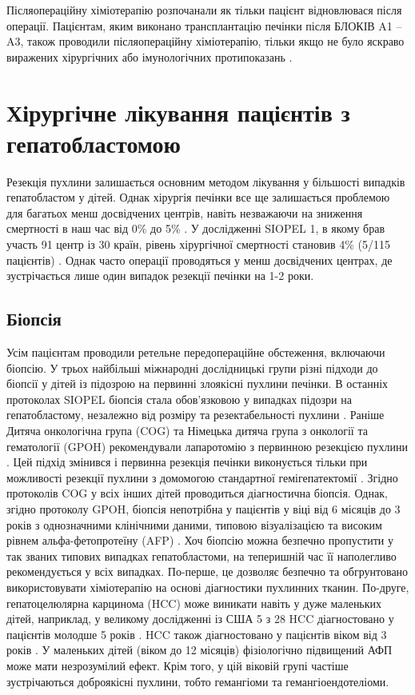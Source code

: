 Післяопераційну хіміотерапію розпочанали як тільки пацієнт відновлювася після операції. Пацієнтам, яким виконано трансплантацію печінки після БЛОКІВ A1 – A3, також проводили післяопераційну хіміотерапію, тільки якщо не було яскраво виражених хірургічних або імунологічних протипоказань \cite{pmid27910913}.


\section{Хірургічне лікування пацієнтів з гепатобластомою}
Резекція пухлини залишається основним методом лікування у більшості випадків гепатобластом у дітей. Однак хірургія печінки все ще залишається проблемою для багатьох менш досвідчених центрів, навіть незважаючи на зниження смертності в наш час від 0\% до 5\% \cite{pmid25649007}. У дослідженні SIOPEL 1, в якому брав участь 91 центр із 30 країн, рівень хірургічної смертності становив 4\% (5/115 пацієнтів) \cite{pmid25783395}. Однак часто операції проводяться у менш досвідчених центрах, де зустрічається лише один випадок резекції печінки на 1-2 роки.
\subsection{Біопсія}
Усім пацієнтам проводили ретельне передопераційне обстеження, включаючи біопсію. У трьох найбільші міжнародні дослідницькі групи різні підходи до біопсії у дітей із підозрою на первинні злоякісні пухлини печінки. В останніх протоколах SIOPEL біопсія стала обов’язковою у випадках підозри на гепатобластому, незалежно від розміру та резектабельності пухлини \cite{pmid25945430}. Раніше Дитяча онкологічна група (COG) та Німецька дитяча група з онкології та гематології (GPOH) рекомендували лапаротомію з первинною резекцією пухлини \cite{pmid26106955}. Цей підхід змінився і первинна резекція печінки виконується тільки  при можливості резекції пухлини з домомогою стандартної гемігепатектомії \cite{pmid26835349}. Згідно протоколів COG у всіх інших дітей проводиться діагностична біопсія. Однак, згідно протоколу GPOH, біопсія непотрібна у пацієнтів у віці від 6 місяців до 3 років з однозначними клінічними даними, типовою візуалізацією та високим рівнем альфа-фетопротеїну (AFP) \cite{pmid26945966}. Хоч біопсію можна безпечно пропустити у так званих типових випадках гепатобластоми, на теперишній час її наполегливо рекомендується у всіх випадках. По-перше, це дозволяє безпечно та обгрунтовано використовувати хіміотерапію на основі діагностики пухлинних тканин. По-друге, гепатоцелюлярна карцинома (HCC) може виникати навіть у дуже маленьких дітей, наприклад, у великому дослідженні із США 5 з 28 HCC діагностовано у пацієнтів молодше 5 років \cite{pmid26945966}. HCC також діагностовано у пацієнтів віком від 3 років \cite{pmid27501172}. У маленьких дітей (віком до 12 місяців) фізіологічно підвищений АФП може мати незрозумілий ефект. Крім того, у цій віковій групі частіше зустрічаються доброякісні пухлини, тобто гемангіоми та гемангіоендотеліоми.

